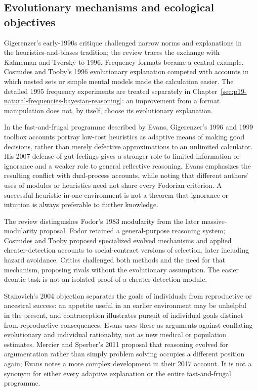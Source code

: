 \subsection{Evolutionary mechanisms and ecological objectives}

Gigerenzer's early-1990s critique challenged narrow norms and explanations
in the heuristics-and-biases tradition; the review traces the exchange with
Kahneman and Tversky to 1996.  Frequency formats became a central example.
Cosmides and Tooby's 1996 evolutionary explanation competed with accounts
in which nested sets or simple mental models made the calculation easier.
The detailed 1995 frequency experiments are treated separately in
Chapter~\ref{sec:p19-natural-frequencies-bayesian-reasoning}: an improvement
from a format manipulation does not, by itself, choose its evolutionary
explanation.

In the fast-and-frugal programme described by Evans, Gigerenzer's 1996 and
1999 toolbox accounts portray low-cost heuristics as adaptive means of making
good decisions, rather than merely defective approximations to an unlimited
calculator.  His 2007 defense of gut feelings gives a stronger role to limited
information or ignorance and a weaker role to general reflective reasoning.
Evans emphasizes the resulting conflict with dual-process accounts, while
noting that different authors' uses of modules or heuristics need not share
every Fodorian criterion.  A successful heuristic in one environment is not
a theorem that ignorance or intuition is always preferable to further knowledge.

The review distinguishes Fodor's 1983 modularity from the later massive-
modularity proposal.  Fodor retained a general-purpose reasoning system;
Cosmides and Tooby proposed specialized evolved mechanisms and applied
cheater-detection accounts to social-contract versions of selection, later
including hazard avoidance.  Critics challenged both methods and the need
for that mechanism, proposing rivals without the evolutionary assumption.
The easier deontic task is not an isolated proof of a cheater-detection module.

Stanovich's 2004 objection separates the goals of individuals from reproductive
or ancestral success: an appetite useful in an earlier environment may be
unhelpful in the present, and contraception illustrates pursuit of individual
goals distinct from reproductive consequences.  Evans uses these as arguments
against conflating evolutionary and individual rationality, not as new medical
or population estimates.  Mercier and Sperber's 2011 proposal that reasoning
evolved for argumentation rather than simply problem solving occupies a
different position again; Evans notes a more complex development in their
2017 account.  It is not a synonym for either every adaptive explanation
or the entire fast-and-frugal programme.

